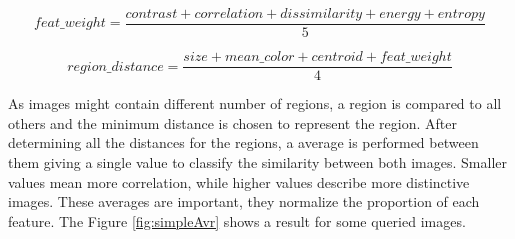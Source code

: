 \documentclass[12pt,a4paper]{article}
\begin{document}
\begin{equation}
	feat\_weight =  \frac{contrast + correlation + dissimilarity +  energy + entropy}{5}
	\label{eq:dist_avr}
\end{equation}

\begin{equation}
region\_distance =  \frac{size + mean\_color + centroid +  feat\_weight}{4}
\label{eq:feat_avr}
\end{equation}

As images might contain different number of regions, a region is compared to all others and the minimum distance is chosen to represent the region. After determining all the distances for the regions, a average is performed between them giving a single value to classify the similarity between both images. Smaller values mean more correlation, while higher values describe more distinctive images. These averages are important, they normalize the proportion of each feature. The Figure \ref{fig:simpleAvr} shows a result for some queried images. \\
\end{document}
